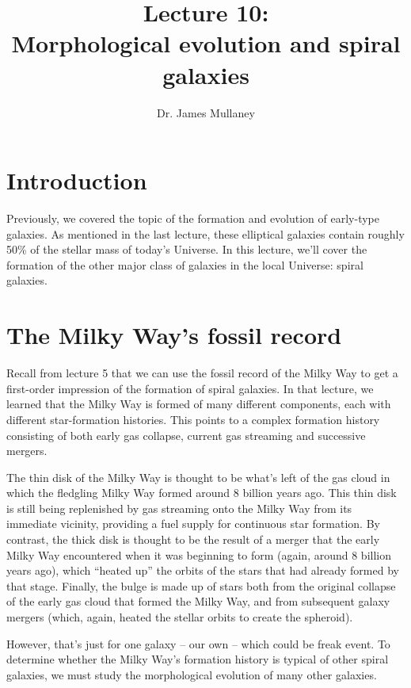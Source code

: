 \documentclass[11pt]{article}
\begin{document}
 
\title{Lecture 10:\\Morphological evolution and spiral galaxies}
\author{Dr. James Mullaney}
\maketitle

\section{Introduction}
Previously, we covered the topic of the formation and evolution of
early-type galaxies. As mentioned in the last lecture, these
elliptical galaxies contain roughly 50\% of the stellar mass of
today's Universe. In this lecture, we'll cover the formation of the
other major class of galaxies in the local Universe: spiral galaxies.

\section{The Milky Way's fossil record}
Recall from lecture 5 that we can use the fossil record of the Milky
Way to get a first-order impression of the formation of spiral
galaxies. In that lecture, we learned that the Milky Way is formed of
many different components, each with different star-formation
histories. This points to a complex formation history consisting of
both early gas collapse, current gas streaming and successive
mergers.

The thin disk of the Milky Way is thought to be what's left of the gas
cloud in which the fledgling Milky Way formed around 8 billion years
ago. This thin disk is still being replenished by gas streaming onto the
Milky Way from its immediate vicinity, providing a fuel supply for
continuous star formation. By contrast, the thick disk is thought to
be the result of a merger that the early Milky Way encountered when it
was beginning to form (again, around 8 billion years ago), which
``heated up'' the orbits of the stars that had already formed by that
stage. Finally, the bulge is made up of stars both from the original
collapse of the early gas cloud that formed the Milky Way, and from
subsequent galaxy mergers (which, again, heated the stellar orbits to
create the spheroid).

However, that's just for one galaxy -- our own -- which could be freak
event. To determine whether the Milky Way's formation history is
typical of other spiral galaxies, we must study the morphological
evolution of many other galaxies.
\end{document}
